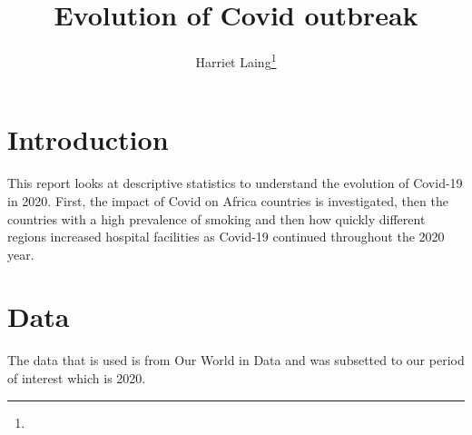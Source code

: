 \documentclass[11pt,preprint, authoryear]{elsarticle}
\numberwithin{equation}{section}
\numberwithin{figure}{section}
\numberwithin{table}{section}
\let\rmarkdownfootnote\footnote%
\def\footnote{\protect\rmarkdownfootnote}
\begin{document}
\begin{frontmatter}  %

\title{Evolution of Covid outbreak}





\author[Add1]{Harriet Laing\footnote{}}
\ead{}





\address[Add1]{Univeristy of Stellenbosch, Cape Town, South Africa}



\vspace{1cm}





\vspace{0.5cm}

\end{frontmatter}



\pagestyle{fancy}
\chead{}
\rhead{}
\lfoot{}
\lhead{}
\cfoot{}


\headsep 35pt %




\hypertarget{introduction}{%
\section{\texorpdfstring{Introduction
\label{Introduction}}{Introduction }}\label{introduction}}

This report looks at descriptive statistics to understand the evolution
of Covid-19 in 2020. First, the impact of Covid on Africa countries is
investigated, then the countries with a high prevalence of smoking and
then how quickly different regions increased hospital facilities as
Covid-19 continued throughout the 2020 year.

\hypertarget{data}{%
\section*{Data}\label{data}}

The data that is used is from Our World in Data and was subsetted to our
period of interest which is 2020.
\end{document}
